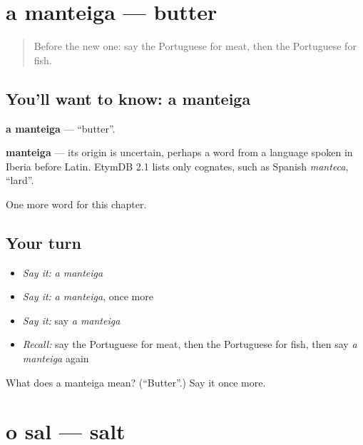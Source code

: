 \section[a manteiga]{a manteiga — butter}

\label{lesson:PT-C44-manteiga}



\begin{quote}
Before the new one: say the Portuguese for meat, then the Portuguese for fish.
\end{quote}

\subsection*{You'll want to know: a manteiga}
\textbf{a manteiga} — \textquotedblleft{}butter\textquotedblright{}.

\begin{cousinweb}
\textbf{manteiga} — its origin is uncertain, perhaps a word from a language spoken in Iberia before Latin. EtymDB 2.1 lists only cognates, such as Spanish \emph{manteca}, \textquotedblleft{}lard\textquotedblright{}.
\end{cousinweb}

\begin{grammarlens}[title={What you've built}]
One more word for this chapter.
\end{grammarlens}

\subsection*{Your turn}
\begin{itemize}
\raggedright
  \item \emph{Say it:} \emph{a manteiga}
  \item \emph{Say it:} \emph{a manteiga}, once more
  \item \emph{Say it:} say \emph{a manteiga}
  \item \emph{Recall:} say the Portuguese for meat, then the Portuguese for fish, then say \emph{a manteiga} again
\end{itemize}

\begin{tcolorbox}[breakable,colback=teal!4,colframe=teal!35!black,title={Before you move on}]
What does a manteiga mean? (\textquotedblleft{}Butter\textquotedblright{}.) Say it once more.
\end{tcolorbox}
\section[o sal]{o sal — salt}

